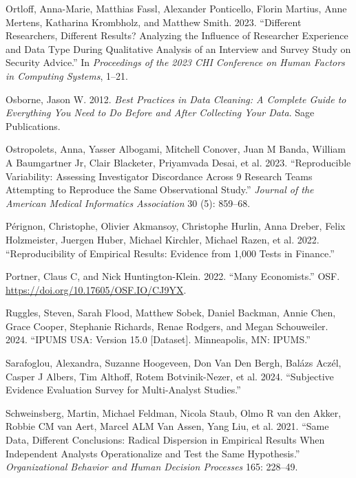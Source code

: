 \documentclass[
  letterpaper,
  DIV=11,
  numbers=noendperiod]{scrartcl}
\newlength{\cslhangindent}
\newlength{\cslentryspacingunit} %
\newenvironment{CSLReferences}[2] %
 {%
  \setlength{\parindent}{0pt}
  \ifodd #1
  \let\oldpar\par
  \def\par{\hangindent=\cslhangindent\oldpar}
  \fi
  \setlength{\parskip}{#2\cslentryspacingunit}
 }%
 {}
\begin{document}
\begin{CSLReferences}{1}{0}
\leavevmode{}%
Ortloff, Anna-Marie, Matthias Fassl, Alexander Ponticello, Florin
Martius, Anne Mertens, Katharina Krombholz, and Matthew Smith. 2023.
{``Different Researchers, Different Results? Analyzing the Influence of
Researcher Experience and Data Type During Qualitative Analysis of an
Interview and Survey Study on Security Advice.''} In \emph{Proceedings
of the 2023 CHI Conference on Human Factors in Computing Systems},
1--21.

\leavevmode{}%
Osborne, Jason W. 2012. \emph{Best Practices in Data Cleaning: A
Complete Guide to Everything You Need to Do Before and After Collecting
Your Data}. Sage Publications.

\leavevmode{}%
Ostropolets, Anna, Yasser Albogami, Mitchell Conover, Juan M Banda,
William A Baumgartner Jr, Clair Blacketer, Priyamvada Desai, et al.
2023. {``Reproducible Variability: Assessing Investigator Discordance
Across 9 Research Teams Attempting to Reproduce the Same Observational
Study.''} \emph{Journal of the American Medical Informatics Association}
30 (5): 859--68.

\leavevmode{}%
Pérignon, Christophe, Olivier Akmansoy, Christophe Hurlin, Anna Dreber,
Felix Holzmeister, Juergen Huber, Michael Kirchler, Michael Razen, et
al. 2022. {``Reproducibility of Empirical Results: Evidence from 1,000
Tests in Finance.''}

\leavevmode{}%
Portner, Claus C, and Nick Huntington-Klein. 2022. {``Many
Economists.''} OSF. \url{https://doi.org/10.17605/OSF.IO/CJ9YX}.

\leavevmode{}%
Ruggles, Steven, Sarah Flood, Matthew Sobek, Daniel Backman, Annie Chen,
Grace Cooper, Stephanie Richards, Renae Rodgers, and Megan Schouweiler.
2024. {``IPUMS USA: Version 15.0 {[}Dataset{]}. Minneapolis, MN:
IPUMS.''}

\leavevmode{}%
Sarafoglou, Alexandra, Suzanne Hoogeveen, Don Van Den Bergh, Balázs
Aczél, Casper J Albers, Tim Althoff, Rotem Botvinik-Nezer, et al. 2024.
{``Subjective Evidence Evaluation Survey for Multi-Analyst Studies.''}

\leavevmode{}%
Schweinsberg, Martin, Michael Feldman, Nicola Staub, Olmo R van den
Akker, Robbie CM van Aert, Marcel ALM Van Assen, Yang Liu, et al. 2021.
{``Same Data, Different Conclusions: Radical Dispersion in Empirical
Results When Independent Analysts Operationalize and Test the Same
Hypothesis.''} \emph{Organizational Behavior and Human Decision
Processes} 165: 228--49.


\end{CSLReferences}
\end{document}
